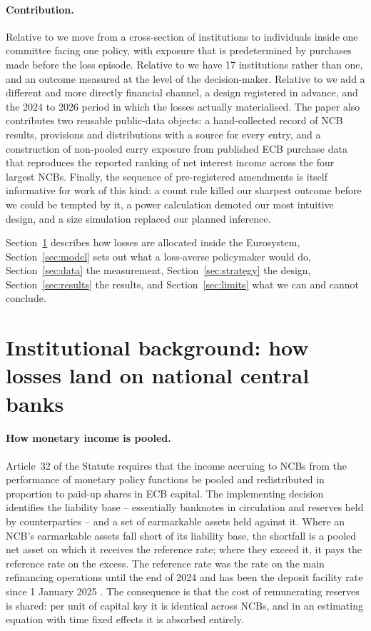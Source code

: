 \documentclass[11pt]{article}
\theoremstyle{plain}
\begin{document}
\paragraph{Contribution.}
Relative to \citet{goncharov2023} we move from a cross-section of institutions to individuals inside one committee facing one policy, with exposure that is predetermined by purchases made before the loss episode. Relative to \citet{grodecka2025} we have 17 institutions rather than one, and an outcome measured at the level of the decision-maker. Relative to \citet{heinemann2026} we add a different and more directly financial channel, a design registered in advance, and the 2024 to 2026 period in which the losses actually materialised. The paper also contributes two reusable public-data objects: a hand-collected record of NCB results, provisions and distributions with a source for every entry, and a construction of non-pooled carry exposure from published ECB purchase data that reproduces the reported ranking of net interest income across the four largest NCBs. Finally, the sequence of pre-registered amendments is itself informative for work of this kind: a count rule killed our sharpest outcome before we could be tempted by it, a power calculation demoted our most intuitive design, and a size simulation replaced our planned inference.

Section~\ref{sec:inst} describes how losses are allocated inside the Eurosystem, Section~\ref{sec:model} sets out what a loss-averse policymaker would do, Section~\ref{sec:data} the measurement, Section~\ref{sec:strategy} the design, Section~\ref{sec:results} the results, and Section~\ref{sec:limits} what we can and cannot conclude.

\section{Institutional background: how losses land on national central banks}\label{sec:inst}

\paragraph{How monetary income is pooled.}
Article~32 of the Statute requires that the income accruing to NCBs from the performance of monetary policy functions be pooled and redistributed in proportion to paid-up shares in ECB capital. The implementing decision identifies the liability base -- essentially banknotes in circulation and reserves held by counterparties -- and a set of earmarkable assets held against it. Where an NCB's earmarkable assets fall short of its liability base, the shortfall is a pooled net asset on which it receives the reference rate; where they exceed it, it pays the reference rate on the excess. The reference rate was the rate on the main refinancing operations until the end of 2024 and has been the deposit facility rate since 1 January 2025 \citep{arrata2026}. The consequence is that the cost of remunerating reserves is shared: per unit of capital key it is identical across NCBs, and in an estimating equation with time fixed effects it is absorbed entirely.
\end{document}

